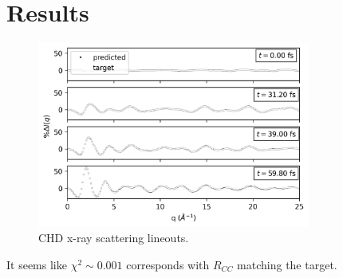 \documentclass[]{article}
\begin{document}
	
	\section{Results}

	\begin{figure}[H]
	\centering
	\includegraphics[width=0.8\textwidth]{lineouts.png}
	\caption{CHD x-ray scattering lineouts.}
	\end{figure}
	
	It seems like $\chi^2 \sim 0.001$ corresponds with $R_{CC}$ matching the target.
	
\end{document}
